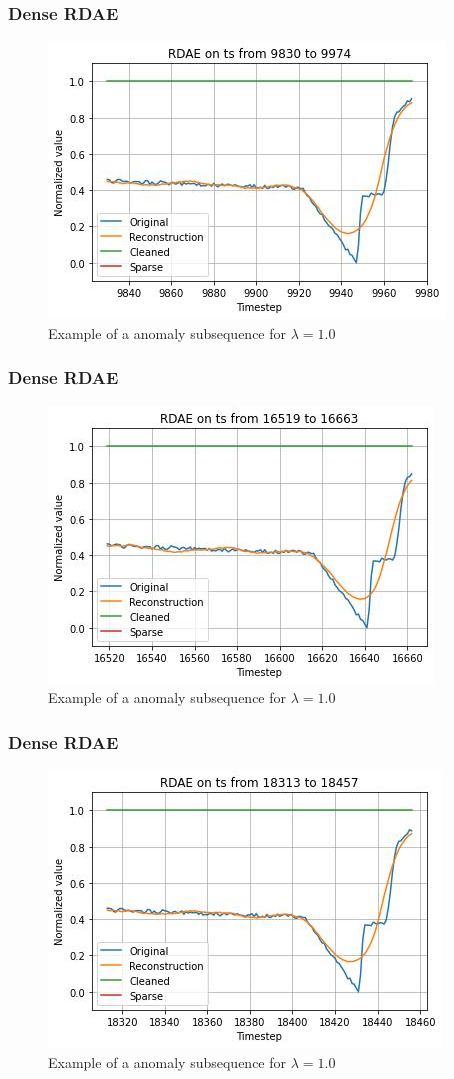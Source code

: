 \documentclass{beamer}
\theoremstyle{plain}
\theoremstyle{definition}
\theoremstyle{remark}
\begin{document}
\begin{frame}
	\frametitle{Dense RDAE}
	\begin{figure}
		\centering
		\includegraphics[width=0.7\linewidth]{Images/lam1.0ts_anomalyzoom9830.jpg}
		\caption[]{Example of a anomaly subsequence for $\lambda=1.0$}
	\end{figure}
\end{frame}

\begin{frame}
	\frametitle{Dense RDAE}
	\begin{figure}
		\centering
		\includegraphics[width=0.7\linewidth]{Images/lam1.0ts_anomalyzoom16519.jpg}
		\caption[]{Example of a anomaly subsequence for $\lambda=1.0$}
	\end{figure}
\end{frame}

\begin{frame}
	\frametitle{Dense RDAE}
	\begin{figure}
		\centering
		\includegraphics[width=0.7\linewidth]{Images/lam1.0ts_anomalyzoom18313.jpg}
		\caption[]{Example of a anomaly subsequence for $\lambda=1.0$}
	\end{figure}
\end{frame}
\end{document}
